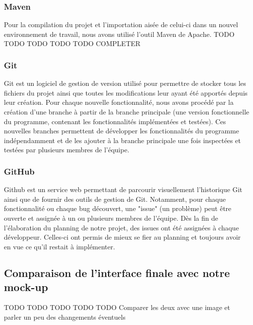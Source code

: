 \subsubsection{Maven}
Pour la compilation du projet et l'importation aisée de celui-ci dans un nouvel environnement de travail, nous avons utilisé l'outil Maven de Apache.
TODO TODO TODO TODO TODO COMPLETER

\subsubsection{Git}
Git est un logiciel de gestion de version utilisé pour permettre de stocker tous les fichiers du projet ainsi que toutes les modifications leur ayant été apportés depuis leur création. Pour chaque nouvelle fonctionnalité, nous avons procédé par la création d'une branche à partir de la branche principale (une version fonctionnelle du programme, contenant les fonctionnalités implémentées et testées). Ces nouvelles branches permettent de développer les fonctionnalités du programme indépendamment et de les ajouter à la branche principale une fois inspectées et testées par plusieurs membres de l'équipe.

\subsubsection{GitHub}
Github est un service web permettant de parcourir visuellement l'historique Git ainsi que de fournir des outils de gestion de Git. Notamment, pour chaque fonctionnalité ou chaque bug découvert, une "issue" (un problème) peut être ouverte et assignée à un ou plusieurs membres de l'équipe. Dès la fin de l'élaboration du planning de notre projet, des issues ont été assignées à chaque développeur. Celles-ci ont permis de mieux se fier au planning et toujours avoir en vue ce qu'il restait à implémenter.

\subsection{Comparaison de l'interface finale avec notre mock-up}
TODO TODO TODO TODO TODO Comparer les deux avec une image et parler un peu des changements éventuels